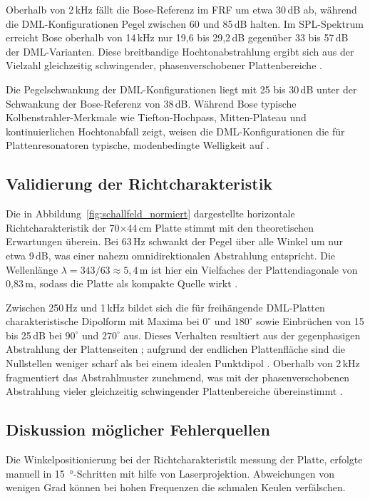 Oberhalb von 2\,kHz fällt die Bose-Referenz im FRF um etwa 30\,dB ab, während die DML-Konfigurationen Pegel zwischen 60 und 85\,dB halten. Im SPL-Spektrum erreicht Bose oberhalb von 14\,kHz nur 19,6 bis 29,2\,dB gegenüber 33 bis 57\,dB der DML-Varianten. Diese breitbandige Hochtonabstrahlung ergibt sich aus der Vielzahl gleichzeitig schwingender, phasenverschobener Plattenbereiche \cite{Harris2000,Bai2001}.

Die Pegelschwankung der DML-Konfigurationen liegt mit 25 bis 30\,dB unter der Schwankung der Bose-Referenz von 38\,dB. Während Bose typische Kolbenstrahler-Merkmale wie Tiefton-Hochpass, Mitten-Plateau und kontinuierlichen Hochtonabfall zeigt, weisen die DML-Konfigurationen die für Plattenresonatoren typische, modenbedingte Welligkeit auf \cite{Cremer1996}.

\subsection{Validierung der Richtcharakteristik}

Die in Abbildung~\ref{fig:schallfeld_normiert} dargestellte horizontale Richtcharakteristik der 70$\times$44\,cm Platte stimmt mit den theoretischen Erwartungen überein. Bei 63\,Hz schwankt der Pegel über alle Winkel um nur etwa 9\,dB, was einer nahezu omnidirektionalen Abstrahlung entspricht. Die Wellenlänge $\lambda = 343/63 \approx 5{,}4$\,m ist hier ein Vielfaches der Plattendiagonale von 0,83\,m, sodass die Platte als kompakte Quelle wirkt \cite{Moeser2005}.

Zwischen 250\,Hz und 1\,kHz bildet sich die für freihängende DML-Platten charakteristische Dipolform mit Maxima bei $0^\circ$ und $180^\circ$ sowie Einbrüchen von 15 bis 25\,dB bei $90^\circ$ und $270^\circ$ aus. Dieses Verhalten resultiert aus der gegenphasigen Abstrahlung der Plattenseiten \cite{Harris2000}; aufgrund der endlichen Plattenfläche sind die Nullstellen weniger scharf als bei einem idealen Punktdipol \cite{Cremer1996}. Oberhalb von 2\,kHz fragmentiert das Abstrahlmuster zunehmend, was mit der phasenverschobenen Abstrahlung vieler gleichzeitig schwingender Plattenbereiche übereinstimmt \cite{Harris2000,Bai2001}.

\subsection{Diskussion möglicher Fehlerquellen}

Die Winkelpositionierung bei der Richtcharakteristik messung der Platte, erfolgte manuell in \SI{15}{\degree}-Schritten mit hilfe von Laserprojektion. Abweichungen von wenigen Grad können bei hohen Frequenzen die schmalen Keulen verfälschen.

